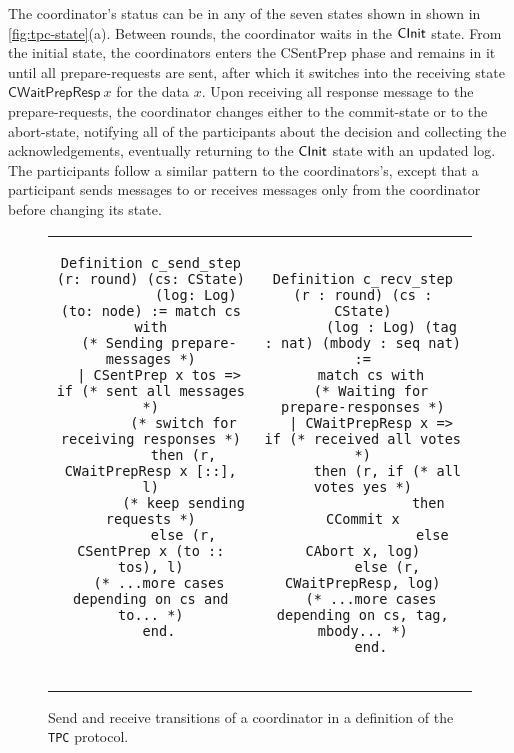 The coordinator's status can be in any of the seven states shown in
shown in \cref{fig:tpc-state}(a).
%
Between rounds, the coordinator waits in the $\mathsf{CInit}$ state.
%
From the initial state, the coordinators enters the \textsf{CSentPrep}
phase and remains in it until all prepare-requests are sent, after
which it switches into the receiving state $\mathsf{CWaitPrepResp}~x$
for the data $x$.
%
Upon receiving all response message to the prepare-requests, the
coordinator changes either to the commit-state or to the abort-state,
notifying all of the participants about the decision and collecting
the acknowledgements, eventually returning to the $\mathsf{CInit}$ state with
an updated log.
%
The participants follow a similar pattern to the coordinators's,
except that a participant sends messages to or receives messages only
from the coordinator before changing its state.

{
\begin{figure}[t!]
\setlength{\belowcaptionskip}{-10pt}
{\centering
\begin{tabular}{c@{\ }c}
\begin{minipage}{0.5\linewidth}
\begin{lstlisting}[style=Coq, basicstyle=\scriptsize\ttfamily]
Definition c_send_step (r: round) (cs: CState)
           (log: Log) (to: node) := match cs with
  (* Sending prepare-messages *)
  | CSentPrep x tos => if (* sent all messages *)
        (* switch for receiving responses *)
        then (r, CWaitPrepResp x [::], l)
        (* keep sending requests *)
        else (r, CSentPrep x (to :: tos), l)
  (* ...more cases depending on cs and to... *)
  end.



\end{lstlisting}
\end{minipage}
&
\begin{minipage}{0.5\linewidth}
\begin{lstlisting}[style=Coq, basicstyle=\scriptsize\ttfamily]
Definition c_recv_step (r : round) (cs : CState)
       (log : Log) (tag : nat) (mbody : seq nat) :=
  match cs with
  (* Waiting for prepare-responses *)
  | CWaitPrepResp x => if (* received all votes *)
      then (r, if (* all votes yes *)
                then CCommit x
	             else CAbort x, log)
      else (r, CWaitPrepResp, log)
  (* ...more cases depending on cs, tag, mbody... *)
  end.
\end{lstlisting}
\vspace{-8pt}
\end{minipage}
\end{tabular}
}
\caption{Send and receive transitions of a coordinator in a \disel
  definition of the {\small\texttt{{TPC}}} protocol.}
\label{fig:coordinator-trans}
\end{figure}
}

